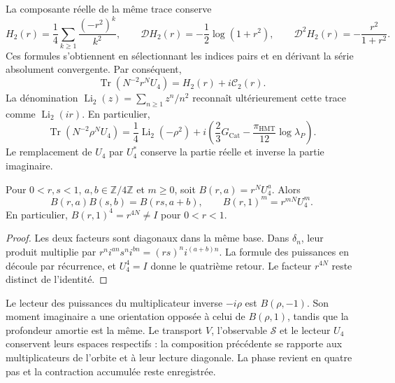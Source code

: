 La composante réelle de la même trace conserve
\[
 H_2(r)=\frac14\sum_{k\geq1}\frac{(-r^2)^k}{k^2},
 \qquad
 \mathcal D H_2(r)=-\frac12\log(1+r^2),\qquad
 \mathcal D^2H_2(r)=-\frac{r^2}{1+r^2}.
\]
Ces formules s’obtiennent en sélectionnant les indices pairs et
en dérivant la série absolument convergente. Par conséquent,
\[
 \operatorname{Tr}(N^{-2}r^NU_4)=H_2(r)+i\mathcal C_2(r).
\]
La dénomination
\(\operatorname{Li}_2(z)=\sum_{n\geq1}z^n/n^2\)
reconnaît ultérieurement cette trace comme
\(\operatorname{Li}_2(ir)\). En particulier,
\[
 \operatorname{Tr}(N^{-2}\rho^NU_4)
 =\frac14\operatorname{Li}_2(-\rho^2)
  +i\left(\frac23G_{\mathrm{Cat}}
       -\frac{\pi_{\mathrm{HMT}}}{12}\log\lambda_P\right).
\]
Le remplacement de \(U_4\) par \(U_4^*\) conserve la partie
réelle et inverse la partie imaginaire.

\begin{proposition}
\label{corpus9:iv:pell-composicion}
Pour \(0<r,s<1\), \(a,b\in\mathbb Z/4\mathbb Z\) et \(m\geq0\), soit
\(B(r,a)=r^NU_4^a\). Alors
\[
 B(r,a)B(s,b)=B(rs,a+b),\qquad
 B(r,1)^m=r^{mN}U_4^m.
\]
En particulier, \(B(r,1)^4=r^{4N}\ne I\) pour \(0<r<1\).

\end{proposition}
\begin{proof}
Les deux facteurs sont diagonaux dans la même base. Dans
\(\delta_n\), leur produit multiplie par
\(r^ni^{an}s^ni^{bn}=(rs)^ni^{(a+b)n}\).
La formule des puissances en découle par récurrence, et
\(U_4^4=I\) donne le quatrième retour. Le facteur
\(r^{4N}\) reste distinct de l’identité.
\end{proof}

Le lecteur des puissances du multiplicateur inverse
\(-i\rho\) est \(B(\rho,-1)\). Son moment imaginaire a une
orientation opposée à celui de \(B(\rho,1)\), tandis que la
profondeur amortie est la même. Le transport \(V\),
l’observable \(\mathscr S\) et le lecteur \(U_4\) conservent
leurs espaces respectifs : la composition précédente se rapporte
aux multiplicateurs de l’orbite et à leur lecture diagonale.
La phase revient en quatre pas et la contraction accumulée
reste enregistrée.


